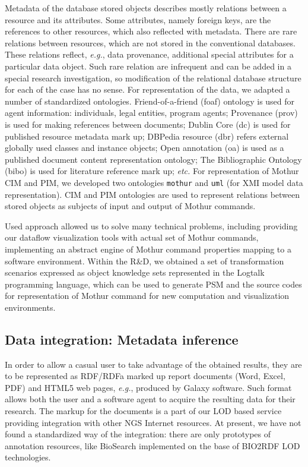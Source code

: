 \documentclass[a4paper]{jpconf}
\begin{document}
Metadata of the database stored objects describes mostly relations between a resource and its attributes.  Some attributes, namely foreign keys, are the references to other resources, which also reflected with metadata.  There are rare relations between resources, which are not stored in the conventional databases.  These relations reflect, \emph{e.g.}, data provenance, additional special attributes for a particular data object.  Such rare relation are infrequent and can be added in a special research investigation, so modification of the relational database structure for each of the case has no sense. For representation of the data, we adapted a number of standardized ontologies. Friend-of-a-friend (foaf) ontology is used for agent information: individuals, legal entities, program agents; Provenance (prov) is used for making references between documents; Dublin Core (dc) is used for published resource metadata mark up; DBPedia resource ({dbr}) refers external globally used classes and instance objects; Open annotation ({oa}) is used as a published document content representation ontology; The Bibliographic Ontology ({bibo}) is used for literature reference mark up; \emph{etc.} For representation of Mothur CIM and PIM, we developed two ontologies \texttt{mothur} and \texttt{uml} (for XMI model data representation).  CIM and PIM ontologies are used to represent relations between stored objects as subjects of input and output of Mothur commands.

Used approach allowed us to solve many technical problems, including providing our dataflow visualization tools with actual set of Mothur commands, implementing an abstract engine of Mothur command properties mapping to a software environment. Within the R\&D, we obtained a set of transformation scenarios expressed as object knowledge sets represented in the Logtalk \cite{logtalk} programming language, which can be used to generate PSM and the source codes for representation of Mothur command for new computation and visualization environments.

\subsection{Data integration: Metadata inference}

In order to allow a casual user to take advantage of the obtained results, they are to be represented as RDF/RDFa marked up report documents (Word, Excel, PDF) and HTML5 web pages, \emph{e.g.}, produced by Galaxy software.  Such format allows both the user and a software agent to acquire the resulting data for their research.  The markup for the documents is a part of our LOD based service providing integration with other NGS Internet resources.  At present, we have not found a standardized way of the integration: there are only prototypes of annotation resources, like BioSearch \cite{biosearch} implemented on the base of BIO2RDF LOD technologies.
\end{document}
